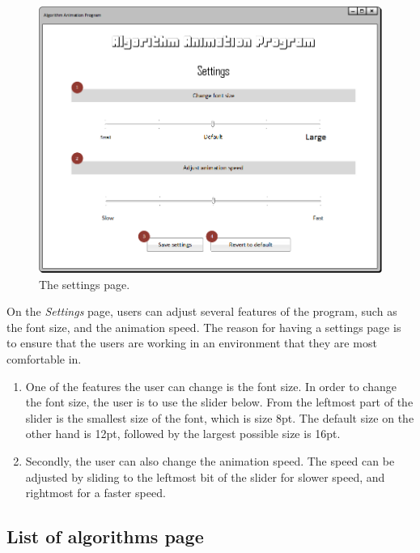 \begin{figure}[H]
\centering
\hspace*{-0.5cm}
\includegraphics[scale=0.8]{images/report_images/uiSettings.png}
\caption{The settings page.}
\label{uiSettings}
\end{figure}

On the \textit{Settings} page, users can adjust several features of the program, such as the font size, and the animation speed. The reason for having a settings page is to ensure that the users are working in an environment that they are most comfortable in.

\begin{enumerate}
\item One of the features the user can change is the font size. In order to change the font size, the user is to use the slider below. From the leftmost part of the slider is the smallest size of the font, which is size 8pt. The default size on the other hand is 12pt, followed by the largest possible size is 16pt. 
\item Secondly, the user can also change the animation speed. The speed can be adjusted by sliding to the leftmost bit of the slider for slower speed, and rightmost for a faster speed.
\end{enumerate}

\subsection{List of algorithms page}

